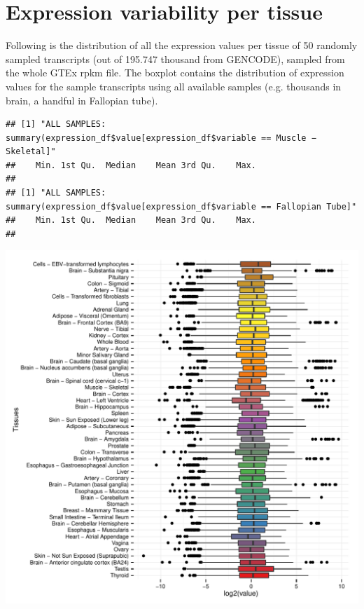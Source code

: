 \documentclass{article}\usepackage[]{graphicx}\usepackage[]{color}
\makeatletter
\def\maxwidth{ %
  \ifdim\Gin@nat@width>\linewidth
    \linewidth
  \else
    \Gin@nat@width
  \fi
}
\newenvironment{kframe}{%
 \def\at@end@of@kframe{}%
 \ifinner\ifhmode%
  \def\at@end@of@kframe{\end{minipage}}%
  \begin{minipage}{\columnwidth}%
 \fi\fi%
 \def\FrameCommand##1{\hskip\@totalleftmargin \hskip-\fboxsep
 \colorbox{shadecolor}{##1}\hskip-\fboxsep
     \hskip-\linewidth \hskip-\@totalleftmargin \hskip\columnwidth}%
 \MakeFramed {\advance\hsize-\width
   \@totalleftmargin\z@ \linewidth\hsize
   \@setminipage}}%
 {\par\unskip\endMakeFramed%
 \at@end@of@kframe}
\newenvironment{knitrout}{}{} %
\makeatother
\begin{document}
\section{Expression variability per tissue}

Following is the distribution of all the expression values per tissue of 50 randomly sampled transcripts (out of 195.747 thousand from GENCODE), sampled from the whole GTEx rpkm file. The boxplot contains the distribution of expression values for the sample transcripts using all available samples (e.g. thousands in brain, a handful in Fallopian tube). \par 

\begin{knitrout}
\color{fgcolor}\begin{kframe}
\begin{verbatim}
## [1] "ALL SAMPLES: summary(expression_df$value[expression_df$variable == Muscle − Skeletal]"
##    Min. 1st Qu.  Median    Mean 3rd Qu.    Max. 
##                                                 
## [1] "ALL SAMPLES: summary(expression_df$value[expression_df$variable == Fallopian Tube]"
##    Min. 1st Qu.  Median    Mean 3rd Qu.    Max. 
## 
\end{verbatim}
\end{kframe}
\includegraphics[width=\maxwidth]{figure/expression_per_tissue-1} 

\end{knitrout}
\end{document}
